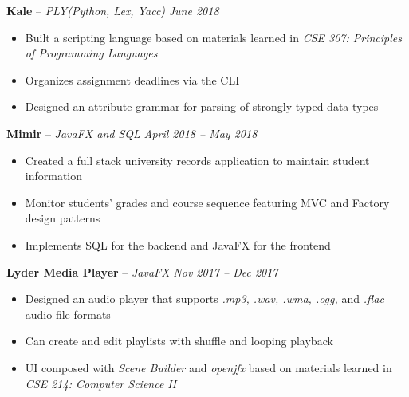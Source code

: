 \documentclass[11pt,letterpaper]{article}
\begin{document}


\headedsection 
{\textbf{Kale} -- \textit{PLY(Python, Lex, Yacc)}}
{\textit{June 2018}} {
		\begin{itemize}[noitemsep,nolistsep]
	\item Built a scripting language based on materials learned in \textit{CSE 307: Principles of Programming Languages}
	\item Organizes assignment deadlines via the CLI
	\item Designed an attribute grammar for parsing of strongly typed data types
\end{itemize}
}


\headedsection 
{\textbf{Mimir} -- \textit{JavaFX and SQL}}
{\textit{April 2018 -- May 2018}} {
\begin{itemize}[noitemsep,nolistsep]
	\item Created a full stack university records application to maintain student information
	\item Monitor students' grades and course sequence featuring MVC and Factory design patterns
	\item Implements SQL for the backend and JavaFX for the frontend
\end{itemize}
}


\headedsection 
{\textbf{Lyder Media Player} -- \textit{JavaFX}}
{\textit{Nov 2017 -- Dec 2017}} {
\begin{itemize}[noitemsep,nolistsep]
	\item Designed an audio player that supports \textit{.mp3, .wav, .wma, .ogg,} and \textit{.flac}  audio file formats
	\item Can create and edit playlists with shuffle and looping playback
	\item UI composed with \textit{Scene Builder} and \textit{openjfx} based on materials learned in \textit{CSE 214: Computer Science II}
\end{itemize}
}

\end{document}
